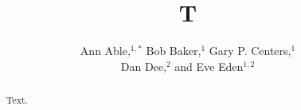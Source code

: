 \documentclass[reprint,amsmath,amssymb,aps]{revtex4-1}
\begin{document}
\title{T}
\author{Ann Able,$^{1,*}$ Bob Baker,$^{1}$ Gary P. Centers,$^{1}$\\  Dan Dee,$^{2}$ and Eve Eden$^{1,2}$}
\begin{abstract}
Text.
\end{abstract}
\maketitle
\end{document}
